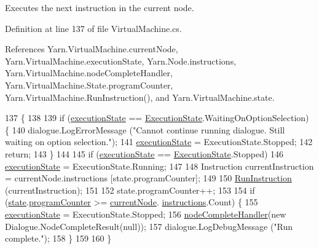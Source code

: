 Executes the next instruction in the current node. 



Definition at line 137 of file Virtual\-Machine.\-cs.



References Yarn.\-Virtual\-Machine.\-current\-Node, Yarn.\-Virtual\-Machine.\-execution\-State, Yarn.\-Node.\-instructions, Yarn.\-Virtual\-Machine.\-node\-Complete\-Handler, Yarn.\-Virtual\-Machine.\-State.\-program\-Counter, Yarn.\-Virtual\-Machine.\-Run\-Instruction(), and Yarn.\-Virtual\-Machine.\-state.


\begin{DoxyCode}
137                                 \{
138 
139             \textcolor{keywordflow}{if} (\hyperlink{a00156_a66491da06023dabfb63d09e6ccbba74f}{executionState} == \hyperlink{a00156_add28fa9c8a45ca579e84d05920bbc42d}{ExecutionState}.WaitingOnOptionSelection) \{
140                 dialogue.LogErrorMessage (\textcolor{stringliteral}{"Cannot continue running dialogue. Still waiting on option
       selection."});
141                 \hyperlink{a00156_a66491da06023dabfb63d09e6ccbba74f}{executionState} = ExecutionState.Stopped;
142                 \textcolor{keywordflow}{return};
143             \}
144 
145             \textcolor{keywordflow}{if} (\hyperlink{a00156_a66491da06023dabfb63d09e6ccbba74f}{executionState} == \hyperlink{a00156_add28fa9c8a45ca579e84d05920bbc42d}{ExecutionState}.Stopped)
146                 \hyperlink{a00156_a66491da06023dabfb63d09e6ccbba74f}{executionState} = ExecutionState.Running;
147 
148             Instruction currentInstruction = currentNode.instructions [state.programCounter];
149 
150             \hyperlink{a00156_ad2caf9ca4f00cdcbd58983be7c106971}{RunInstruction} (currentInstruction);
151 
152             state.programCounter++;
153 
154             \textcolor{keywordflow}{if} (\hyperlink{a00156_a70f2ce6201cdd2430ceaa764ac614ca0}{state}.\hyperlink{a00159_a2c76546b54b4fb573d7f14d79ce230a3}{programCounter} >= \hyperlink{a00156_ab7594e14981ad75cecea3b2e7dcf895c}{currentNode}.
      \hyperlink{a00045_a156723a9252b62d288ddf611939ea7c3}{instructions}.Count) \{
155                 \hyperlink{a00156_a66491da06023dabfb63d09e6ccbba74f}{executionState} = ExecutionState.Stopped;
156                 \hyperlink{a00156_a5129c63e67e2d4e2780d86b8351320a2}{nodeCompleteHandler}(\textcolor{keyword}{new} Dialogue.NodeCompleteResult(null));
157                 dialogue.LogDebugMessage (\textcolor{stringliteral}{"Run complete."});
158             \}
159 
160         \}
\end{DoxyCode}


